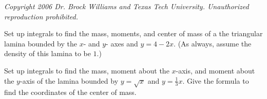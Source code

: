 \documentclass{exam}[12pt]
\begin{document}
\pagestyle{head}

\extraheadheight{.9in}
\extrafootheight{-1in} 
\small{\textit{
Copyright 2006 Dr. Brock Williams and
Texas Tech University.  Unauthorized reproduction prohibited.}}

\begin{questions}
\large{

\question Set up integrals to find the mass, moments, and center of mass of a the
triangular lamina bounded by the $x$- and $y$- axes and $y=4-2x$.
(As always, assume the density of this lamina to be $1$.)

\vspace{3.5in}

\question Set up integrals to find the mass, moment about the $x$-axis, and
moment about the $y$-axis of the lamina bounded by $y=\sqrt{x}$ and
$y=\displaystyle \frac{1}{3} x$.  
Give the formula to find the coordinates of the center of mass.
\vspace{2.5in}


}
\end{questions}
\end{document}
